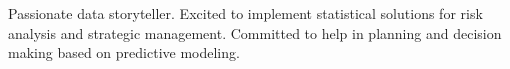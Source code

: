 \begin{flushleft}
    Passionate data storyteller.
    Excited to implement statistical solutions for risk analysis and strategic management.
    Committed to help in planning and decision making based on predictive modeling.
\end{flushleft}
